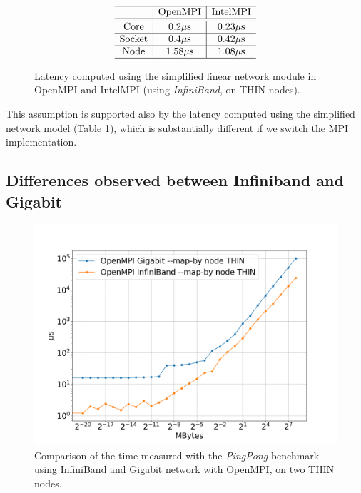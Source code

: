 \documentclass{article}
\begin{document}
\begin{figure}[b]
    $$
        \begin{array}{c | c | c} \hline
            & \text{OpenMPI} & \text{IntelMPI} \\ \hline
            \hline
            \text{Core} & 0.2 \mu \text{s}  & 0.23 \mu \text{s} \\ \hline
            \text{Socket} & 0.4 \mu \text{s}  & 0.42 \mu \text{s} \\ \hline
            \text{Node} & 1.58 \mu \text{s}  & 1.08 \mu \text{s} \\ \hline
        \end{array}
    $$
    \caption{Latency computed using the simplified linear network module in OpenMPI and IntelMPI (using \emph{InfiniBand}, on THIN nodes).}
    \label{tab:lat_ompi_intel}
\end{figure}

This assumption is supported also by the latency computed using the simplified network model (Table \ref{tab:lat_ompi_intel}), which is substantially different if we switch the MPI implementation.

\subsection{Differences observed between Infiniband and Gigabit}
\begin{figure}[t]
    \centering
    \includegraphics[width=\textwidth]{benchmark/infi_vs_giga_node.png}
    \caption{Comparison of the time measured with the \emph{PingPong} benchmark using InfiniBand and Gigabit network with OpenMPI, on two THIN nodes.}
    \label{fig:infi_vs_giga}
\end{figure}
\end{document}
